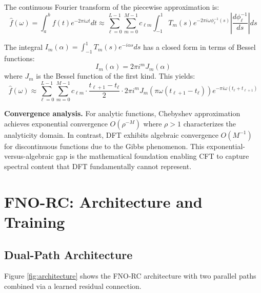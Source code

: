 \documentclass[11pt]{article}
\begin{document}
The continuous Fourier transform of the piecewise approximation is:
\begin{equation}
\hat{f}(\omega) = \int_a^b f(t) e^{-2\pi i \omega t} dt \approx \sum_{\ell=0}^{L-1} \sum_{m=0}^{M-1} c_{\ell m} \int_{-1}^{1} T_m(s) e^{-2\pi i \omega \phi_\ell^{-1}(s)} \left|\frac{d\phi_\ell^{-1}}{ds}\right| ds
\end{equation}

The integral $I_m(\alpha) = \int_{-1}^{1} T_m(s) e^{-i\alpha s} ds$ has a closed form in terms of Bessel functions:
\begin{equation}
I_m(\alpha) = 2\pi i^m J_m(\alpha)
\end{equation}
where $J_m$ is the Bessel function of the first kind. This yields:
\begin{equation}
\hat{f}(\omega) \approx \sum_{\ell=0}^{L-1} \sum_{m=0}^{M-1} c_{\ell m} \cdot \frac{t_{\ell+1} - t_\ell}{2} \cdot 2\pi i^m J_m\left(\pi \omega (t_{\ell+1} - t_\ell)\right) e^{-\pi i \omega (t_\ell + t_{\ell+1})}
\end{equation}

\textbf{Convergence analysis.} For analytic functions, Chebyshev approximation achieves exponential convergence $O(\rho^{-M})$ where $\rho > 1$ characterizes the analyticity domain. In contrast, DFT exhibits algebraic convergence $O(M^{-1})$ for discontinuous functions due to the Gibbs phenomenon. This exponential-versus-algebraic gap is the mathematical foundation enabling CFT to capture spectral content that DFT fundamentally cannot represent.

\section{FNO-RC: Architecture and Training}

\subsection{Dual-Path Architecture}

Figure \ref{fig:architecture} shows the FNO-RC architecture with two parallel paths combined via a learned residual connection.
\end{document}
